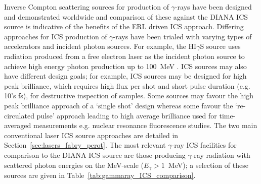\documentclass[../main.tex]{subfiles}
\begin{document}
Inverse Compton scattering sources for production of $\gamma$-rays have been designed and demonstrated worldwide and comparison of these against the DIANA ICS source is indicative of the benefits of the ERL driven ICS approach. Differing approaches for ICS production of $\gamma$-rays have been trialed with varying types of accelerators and incident photon sources. For example, the HI$\gamma$S source uses radiation produced from a free electron laser as the incident photon source to achieve high energy photon production up to 100~\si{\mega\electronvolt} \cite{weller2009research}. ICS sources may also have different design goals; for example, ICS sources may be designed for high peak brilliance, which requires high flux per shot and short pulse duration (e.g. 10's \si{\femto\second}), for destructive inspection of samples. Some sources may favour the high peak brilliance approach of a `single shot' design whereas some favour the `re-circulated pulse' approach leading to high average brilliance used for time-averaged measurements e.g. nuclear resonance fluorescence studies. The two main conventional laser ICS source approaches are detailed in Section~\ref{sec:lasers_fabry_perot}. The most relevant $\gamma$-ray ICS facilities for comparison to the DIANA ICS source are those producing $\gamma$-ray radiation with scattered photon energies on the \si{\mega\electronvolt}-scale ($E_{\gamma}>1$~\si{\mega\electronvolt}); a selection of these sources are given in Table~\ref{tab:gammaray_ICS_comparison}. 
\end{document}
